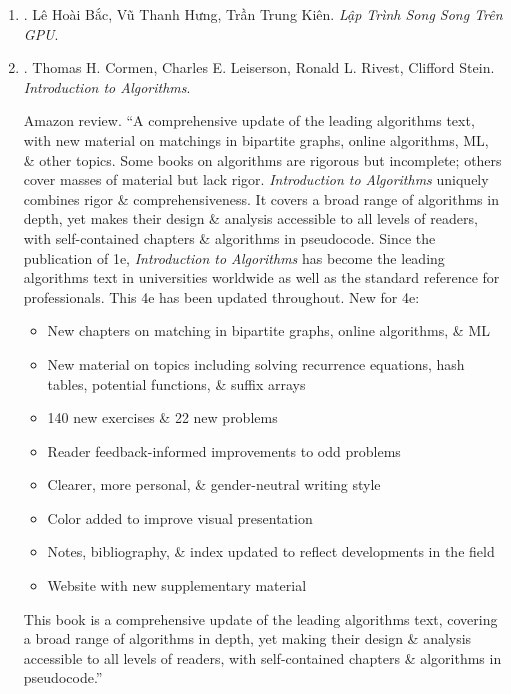 \documentclass{article}
\begin{document}
\begin{enumerate}
	\item \cite{Bac_Hung_Kien_parallel_programming}. {\sc Lê Hoài Bắc, Vũ Thanh Hưng, Trần Trung Kiên}. {\it Lập Trình Song Song Trên GPU}.\hfill{\sf[done]}
	
	\item \cite{Cormen_Leiserson_Rivest_Stein_algorithm}. {\sc Thomas H. Cormen, Charles E. Leiserson,  Ronald L. Rivest, Clifford Stein}. {\it Introduction to Algorithms}. {}
	
	{\sf Amazon review.} ``A comprehensive update of the leading algorithms text, with new material on matchings in bipartite graphs, online algorithms, ML, \& other topics. Some books on algorithms are rigorous but incomplete; others cover masses of material but lack rigor. {\it Introduction to Algorithms} uniquely combines rigor \& comprehensiveness. It covers a broad range of algorithms in depth, yet makes their design \& analysis accessible to all levels of readers, with self-contained chapters \& algorithms in pseudocode. Since the publication of 1e, {\it Introduction to Algorithms} has become the leading algorithms text in universities worldwide as well as the standard reference for professionals. This 4e has been updated throughout. New for 4e:
	\begin{itemize}
		\item New chapters on matching in bipartite graphs, online algorithms, \& ML
		\item New material on topics including solving recurrence equations, hash tables, potential functions, \& suffix arrays
		\item 140 new exercises \& 22 new problems
		\item Reader feedback-informed improvements to odd problems
		\item Clearer, more personal, \& gender-neutral writing style
		\item Color added to improve visual presentation
		\item Notes, bibliography, \& index updated to reflect developments in the field
		\item Website with new supplementary material
	\end{itemize}
	This book is a comprehensive update of the leading algorithms text, covering a broad range of algorithms in depth, yet making their design \& analysis accessible to all levels of readers, with self-contained chapters \& algorithms in pseudocode.''
	\begin{itemize}

\end{itemize}
\end{enumerate}
\end{document}
